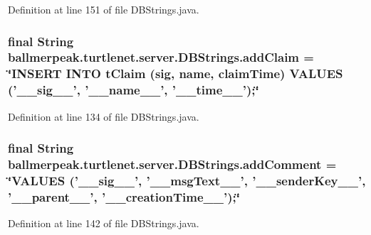 Definition at line 151 of file D\-B\-Strings.\-java.

\hypertarget{classballmerpeak_1_1turtlenet_1_1server_1_1DBStrings_a7622f836df4c75f736ae6b35eaa936a9}{
\subsubsection[{add\-Claim}]{\setlength{\rightskip}{0pt plus 5cm}final String ballmerpeak.\-turtlenet.\-server.\-D\-B\-Strings.\-add\-Claim = \char`\"{}I\-N\-S\-E\-R\-T I\-N\-T\-O t\-Claim (sig, name, claim\-Time) V\-A\-L\-U\-E\-S ('\-\_\-\-\_\-sig\-\_\-\-\_\-', '\-\_\-\-\_\-name\-\_\-\-\_\-', '\-\_\-\-\_\-time\-\_\-\-\_\-');\char`\"{}\hspace{0.3cm}{\ttfamily [static]}}}\label{classballmerpeak_1_1turtlenet_1_1server_1_1DBStrings_a7622f836df4c75f736ae6b35eaa936a9}


Definition at line 134 of file D\-B\-Strings.\-java.

\hypertarget{classballmerpeak_1_1turtlenet_1_1server_1_1DBStrings_a87d52ca49fb4861212ad5e9319ca8707}{
\subsubsection[{add\-Comment}]{\setlength{\rightskip}{0pt plus 5cm}final String ballmerpeak.\-turtlenet.\-server.\-D\-B\-Strings.\-add\-Comment = \char`\"{}V\-A\-L\-U\-E\-S ('\-\_\-\-\_\-sig\-\_\-\-\_\-', '\-\_\-\-\_\-msg\-Text\-\_\-\-\_\-', '\-\_\-\-\_\-sender\-Key\-\_\-\-\_\-', '\-\_\-\-\_\-parent\-\_\-\-\_\-', '\-\_\-\-\_\-creation\-Time\-\_\-\-\_\-');\char`\"{}\hspace{0.3cm}{\ttfamily [static]}}}\label{classballmerpeak_1_1turtlenet_1_1server_1_1DBStrings_a87d52ca49fb4861212ad5e9319ca8707}


Definition at line 142 of file D\-B\-Strings.\-java.

